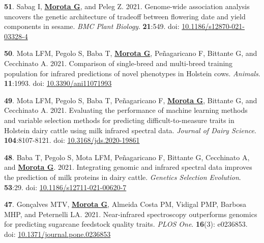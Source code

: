 \documentclass[margin,line,10pt]{res}
\newenvironment{list1}{
  \begin{list}{\ding{113}}{%
      \setlength{\itemsep}{0in}
      \setlength{\parsep}{0in} \setlength{\parskip}{0in}
      \setlength{\topsep}{0in} \setlength{\partopsep}{0in} 
      \setlength{\leftmargin}{0.17in}}}{\end{list}}
\begin{document}
\begin{resume}
\begin{list1}
    \item [{\bf 51}.] Sabag I, \textbf{\underline{Morota G}}, and Peleg Z. 2021. Genome-wide association analysis uncovers the genetic architecture of tradeoff between flowering date and yield components in sesame.  \emph{BMC Plant Biology}. \textbf{21}:549. doi: \textcolor{blue}{\href{https://doi.org/10.1186/s12870-021-03328-4}{10.1186/s12870-021-03328-4}} 

      \vspace{0.5cm}

\item [{\bf 50}.] Mota LFM, Pegolo S, Baba T, \textbf{\underline{Morota G}}, Pe\~{n}agaricano F, Bittante G, and Cecchinato A. 2021. Comparison of single-breed and multi-breed training population for infrared predictions of novel phenotypes in Holstein cows. \emph{Animals}. \textbf{11}:1993. doi: \textcolor{blue}{\href{https://doi.org/10.3390/ani11071993}{10.3390/ani11071993}}

      \vspace{0.5cm}
  
\item [{\bf 49}.] Mota LFM, Pegolo S, Baba T, Pe\~{n}agaricano F, \textbf{\underline{Morota G}}, Bittante G, and Cecchinato A. 2021. Evaluating the performance of machine learning methods and variable selection methods for predicting difficult-to-measure traits in Holstein dairy cattle using milk infrared spectral data. \emph{Journal of Dairy Science}. \textbf{104}:8107-8121. doi: \textcolor{blue}{\href{https://doi.org/10.3168/jds.2020-19861}{10.3168/jds.2020-19861}}

    \vspace{0.5cm}

\item [{\bf 48}.] Baba T, Pegolo S, Mota LFM, Pe\~{n}agaricano F, Bittante G, Cecchinato A, and \textbf{\underline{Morota G}}. 2021. Integrating genomic and infrared spectral data improves the prediction of milk proteins in dairy cattle. \emph{Genetics Selection Evolution}. \textbf{53}:29. doi: \textcolor{blue}{\href{https://doi.org/10.1186/s12711-021-00620-7}{10.1186/s12711-021-00620-7}}
  
  \vspace{0.5cm}
  
\item [{\bf 47}.] Gon\c{c}alves MTV, \textbf{\underline{Morota G}}, Almeida Costa PM, Vidigal PMP, Barbosa MHP, and Peternelli LA. 2021. Near-infrared spectroscopy outperforms genomics for predicting sugarcane feedstock quality traits.  \emph{PLOS One}. \textbf{16}(3): e0236853. doi: \textcolor{blue}{\href{https://doi.org/10.1371/journal.pone.0236853}{10.1371/journal.pone.0236853}}


\end{list1}
\end{resume}
\end{document}

